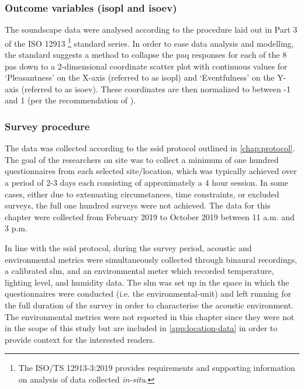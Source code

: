 
\subsubsection*{Outcome variables (\gls{isopl} and \gls{isoev})}
\label{sec:whoOutcomeVar}
The soundscape data were analysed according to the procedure laid out in Part 3 of the ISO 12913 \footnote{The ISO/TS 12913-3:2019 provides requirements and supporting information on analysis of data collected \emph{in-situ}.} standard series. In order to ease data analysis and modelling, the standard suggests a method to collapse the \gls{paq} responses for each of the 8 \glspl{pa} down to a 2-dimensional coordinate scatter plot with continuous values for `Pleasantness' on the X-axis (referred to as \gls{isopl}) and `Eventfulness' on the Y-axis (referred to as \gls{isoev}). These coordinates are then normalized to between -1 and 1 (per the recommendation of \citet{ISO12913Part3}).

\subsubsection*{Survey procedure}

The data was collected according to the \gls{ssid} protocol outlined in \cref{chap:protocol}. The goal of the researchers on site was to collect a minimum of one hundred questionnaires from each selected site/location, which was typically achieved over a period of 2-3 days each consisting of approximately a 4 hour session. In some cases, either due to extenuating circumstances, time constraints, or excluded surveys, the full one hundred surveys were not achieved. The data for this chapter were collected from  February 2019 to  October 2019 between 11 a.m. and 3 p.m.

In line with the \gls{ssid} protocol, during the survey period, acoustic and environmental metrics were simultaneously collected through binaural recordings, a calibrated \gls{slm}, and an environmental meter which recorded temperature, lighting level, and humidity data. The \gls{slm} was set up in the space in which the questionnaires were conducted (i.e. the \gls{environmental-unit}) and left running for the full duration of the survey in order to characterise the acoustic environment. The environmental metrics were not reported in this chapter since they were not in the scope of this study but are included in \cref{app:location-data} in order to provide context for the interested readers. 

